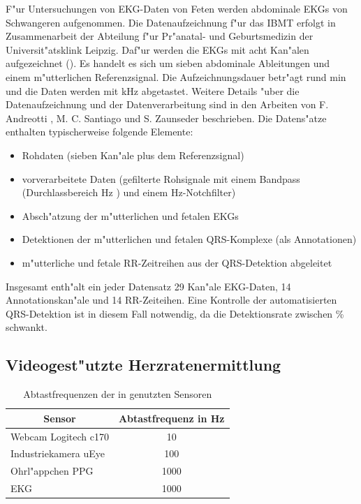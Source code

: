 F"ur Untersuchungen von \ac{EKG}-Daten von Feten werden abdominale \acp{EKG} von Schwangeren aufgenommen.
Die Datenaufzeichnung f"ur das \ac{IBMT} erfolgt in Zusammenarbeit der Abteilung f"ur Pr"anatal- und Geburtsmedizin der Universit"atsklink Leipzig.
Daf"ur werden die \acp{EKG} mit acht Kan"alen aufgezeichnet ().
Es handelt es sich um sieben abdominale Ableitungen und einem m"utterlichen Referenzsignal.
Die Aufzeichnungsdauer betr"agt rund \unit[20]{min} und die Daten werden mit \unit[1]{kHz} abgetastet.
Weitere Details "uber die Datenaufzeichnung und der Datenverarbeitung sind in den Arbeiten von F. Andreotti \cite{Andreotti2011}, M. C. Santiago \cite{Santiago2012} und S. Zaunseder \cite{Zaunseder2012} beschrieben.
Die Datens"atze enthalten typischerweise folgende Elemente:
\begin{itemize}
	\item Rohdaten (sieben Kan"ale plus dem Referenzsignal)
	\item vorverarbeitete Daten (gefilterte Rohsignale mit einem Bandpass (Durchlassbereich \unit[2 bis 100]{Hz} \cite{Andreotti2011}) und einem \unit[49 - 51]{Hz}-Notchfilter)
	\item Absch"atzung der m"utterlichen und fetalen \acp{EKG}
	\item Detektionen der m"utterlichen und fetalen QRS-Komplexe (als Annotationen)
	\item m"utterliche und fetale RR-Zeitreihen aus der QRS-Detektion abgeleitet
\end{itemize}
Insgesamt enth"alt ein jeder Datensatz 29 Kan"ale \ac{EKG}-Daten, 14 Annotationskan"ale und 14 RR-Zeiteihen.
Eine Kontrolle der automatisierten QRS-Detektion ist in diesem Fall notwendig, da die Detektionsrate zwischen \unit[66,1 und 94,5]{\%} \cite{Zaunseder2012} schwankt.



\subsection{Videogest"utzte Herzratenermittlung}

\begin{table}[bht]
\centering
\begin{tabular}{l|c}
	\hline
	\multicolumn{1}{|c|}{Sensor} & \multicolumn{1}{|c|}{Abtastfrequenz in \unit{Hz}} \\\hline
	Webcam Logitech c170 & 10 \\
	Industriekamera uEye & 100 \\
	Ohrl"appchen \ac{PPG} & 1000 \\
	\ac{EKG} & 1000 \\
\end{tabular}
\caption[Abtastfrequenzen genutzter Sensoren]{Abtastfrequenzen der in \cite{Zhai2012} genutzten Sensoren}
\label{tab:zhai_frequenzen}
\end{table}

